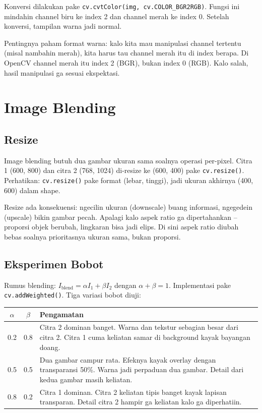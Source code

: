 \documentclass[11pt,a4paper]{article}
\begin{document}
Konversi dilakukan pake \texttt{cv.cvtColor(img, cv.COLOR\_BGR2RGB)}. Fungsi ini mindahin channel biru ke index 2 dan channel merah ke index 0. Setelah konversi, tampilan warna jadi normal.

Pentingnya paham format warna: kalo kita mau manipulasi channel tertentu (misal nambahin merah), kita harus tau channel merah itu di index berapa. Di OpenCV channel merah itu index 2 (BGR), bukan index 0 (RGB). Kalo salah, hasil manipulasi ga sesuai ekspektasi.

\section{Image Blending}

\subsection{Resize}

Image blending butuh dua gambar ukuran sama soalnya operasi per-pixel. Citra 1 (600, 800) dan citra 2 (768, 1024) di-resize ke (600, 400) pake \texttt{cv.resize()}. Perhatikan: \texttt{cv.resize()} pake format (lebar, tinggi), jadi ukuran akhirnya (400, 600) dalam shape.

Resize ada konsekuensi: ngecilin ukuran (downscale) buang informasi, ngegedein (upscale) bikin gambar pecah. Apalagi kalo aspek ratio ga dipertahankan -- proporsi objek berubah, lingkaran bisa jadi elips. Di sini aspek ratio diubah bebas soalnya prioritasnya ukuran sama, bukan proporsi.

\subsection{Eksperimen Bobot}

Rumus blending: $I_{\text{blend}} = \alpha I_1 + \beta I_2$ dengan $\alpha + \beta = 1$. Implementasi pake \texttt{cv.addWeighted()}. Tiga variasi bobot diuji:

\begin{center}
\begin{tabularx}{\textwidth}{c c X}
\toprule
$\alpha$ & $\beta$ & Pengamatan \\
\midrule
0.2 & 0.8 & Citra 2 dominan banget. Warna dan tekstur sebagian besar dari citra 2. Citra 1 cuma keliatan samar di background kayak bayangan doang. \\
0.5 & 0.5 & Dua gambar campur rata. Efeknya kayak overlay dengan transparansi 50\%. Warna jadi perpaduan dua gambar. Detail dari kedua gambar masih keliatan. \\
0.8 & 0.2 & Citra 1 dominan. Citra 2 keliatan tipis banget kayak lapisan transparan. Detail citra 2 hampir ga keliatan kalo ga diperhatiin. \\
\bottomrule
\end{tabularx}
\end{center}
\end{document}

